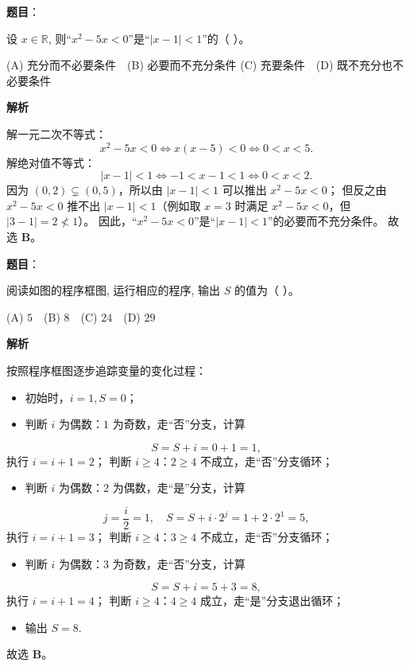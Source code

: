 \begin{answer}

\textbf{题目}：

设 $x \in \mathbb{R}$, 则“$x^2 - 5x < 0$”是“$|x - 1| < 1$”的（ ）。

(A) 充分而不必要条件　(B) 必要而不充分条件  
(C) 充要条件　(D) 既不充分也不必要条件

\textbf{解析}

解一元二次不等式：
\nopagebreak[4]
\[x^2 - 5x < 0 \iff x(x - 5) < 0 \iff 0 < x < 5.\]
解绝对值不等式：
\nopagebreak[4]
\[|x - 1| < 1 \iff -1 < x - 1 < 1 \iff 0 < x < 2.\]
因为 $(0, 2) \subsetneq (0, 5)$，所以由 $|x - 1| < 1$ 可以推出 $x^2 - 5x < 0$；
但反之由 $x^2 - 5x < 0$ 推不出 $|x - 1| < 1$（例如取 $x = 3$ 时满足 $x^2 - 5x < 0$，但 $|3 - 1| = 2 \not< 1$）。
因此，“$x^2 - 5x < 0$”是“$|x - 1| < 1$”的必要而不充分条件。
故选 \textbf{B}。


\end{answer}
\begin{answer}

\textbf{题目}：

阅读如图的程序框图, 运行相应的程序, 输出 $S$ 的值为（ ）。
\nopagebreak[4]
\begin{center}\end{center}
\nopagebreak[4]
(A) $5$　(B) $8$　(C) $24$　(D) $29$

\textbf{解析}

按照程序框图逐步追踪变量的变化过程：
\begin{itemize}
\item 初始时，$i = 1, S = 0$；
\item 判断 $i$ 为偶数：$1$ 为奇数，走“否”分支，计算
\end{itemize}
\nopagebreak[4]
\[S = S + i = 0 + 1 = 1,\]
  执行 $i = i + 1 = 2$；
  判断 $i \geqslant 4$：$2 \geqslant 4$ 不成立，走“否”分支循环；
\begin{itemize}
\item 判断 $i$ 为偶数：$2$ 为偶数，走“是”分支，计算
\end{itemize}
\nopagebreak[4]
\[j = \frac{i}{2} = 1,\quad S = S + i \cdot 2^j = 1 + 2 \cdot 2^1 = 5,\]
  执行 $i = i + 1 = 3$；
  判断 $i \geqslant 4$：$3 \geqslant 4$ 不成立，走“否”分支循环；
\begin{itemize}
\item 判断 $i$ 为偶数：$3$ 为奇数，走“否”分支，计算
\end{itemize}
\nopagebreak[4]
\[S = S + i = 5 + 3 = 8,\]
  执行 $i = i + 1 = 4$；
  判断 $i \geqslant 4$：$4 \geqslant 4$ 成立，走“是”分支退出循环；
\begin{itemize}
\item 输出 $S = 8$.
\end{itemize}
故选 \textbf{B}。


\end{answer}
